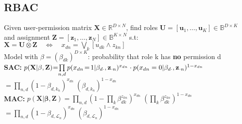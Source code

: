 \documentclass[a4paper,11pt]{article}
\newcommand{\R}{\mathbb{R}}
\newcommand{\B}{\mathbb{B}}
\newcommand{\LL}{\mathcal{L}}
\newcommand{\msection}[1]{\section{#1}\vspace{-0.5mm}}
\begin{document}
\begin{multicols}{2}
\msection{RBAC}
Given user-permission matrix $\mathbf X \in \R^{D \times N}$, find roles $\mathbf U = [\mathbf{u}_1, \ldots, \mathbf{u}_K] \in \B^{D \times K}$ and assignment $\mathbf Z = [\mathbf{z}_1, \ldots, \mathbf{z}_N] \in \B^{K \times N}$ s.t:\\
$\mathbf X = \mathbf U \otimes \mathbf Z \quad \Longleftrightarrow \quad x_{dn} = \bigvee_k [u_{dk} \land z_{kn}]$\\
\vspace{0.2cm}
Model with $\beta = (\beta_{dk})^{D \times K}$: probability that role k has \textbf{no} permission d\\
\textbf{SAC:} ${p(\mathbf X|\mathbf \beta, \mathbf Z) \hspace{-0.08cm} = \hspace{-0.1cm} \prod\limits_{n,d} p(x_{dn} \hspace{-0.05cm} = \hspace{-0.05cm} 1| \beta_{d \cdot}, \mathbf{z}_{\cdot n})^{x_{dn}} \cdot p(x_{dn} = 0 | \beta_{d \cdot}, \mathbf{z}_{\cdot n})^{1 - x_{dn}}}$\\ 
\hspace{2.55cm}$= \prod\limits_{n,d}(1-\beta_{d, k_n})^{x_{dn}} \; (\beta_{d, k_n})^{1-x_{dn}}$\\

\textbf{MAC:} $p(\mathbf X|\mathbf \beta, \mathbf Z) = \prod\limits_{n,d} (
   1 - \prod\limits_k \beta_{dk}^{z_{kn}})^{x_{dn}} \; ( \prod\limits_k \beta_{dk}^{z_{kn}})^{1-x_{dn}}$\\
\hspace{2.75cm}$= \prod\limits_{n,d}(1-\beta_{d, \LL_n})^{x_{dn}} \; (\beta_{d, \LL_n})^{1-x_{dn}}$\\


\end{multicols}
\end{document}
